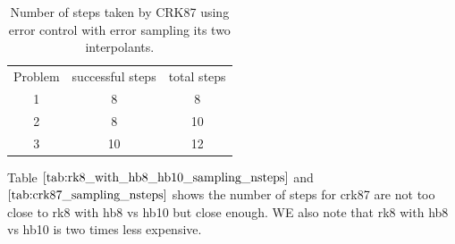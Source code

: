 \begin{table}[h]
\caption {Number of steps taken by CRK87 using error control with error sampling its two interpolants.} \label{tab:crk87_sampling_nsteps}
\begin{center}
\begin{tabular}{ c c c } 
Problem & successful steps & total steps \\ 
1       & 8               & 8 \\ 
2       & 8               & 10 \\
3       & 10              & 12 \\
\end{tabular}
\end{center}
\end{table}

Table $\ref{tab:rk8_with_hb8_hb10_sampling_nsteps}$ and $\ref{tab:crk87_sampling_nsteps}$ shows the number of steps for crk87 are not too close to rk8 with hb8 vs hb10 but close enough. WE also note that rk8 with hb8 vs hb10 is two times less expensive.

 
